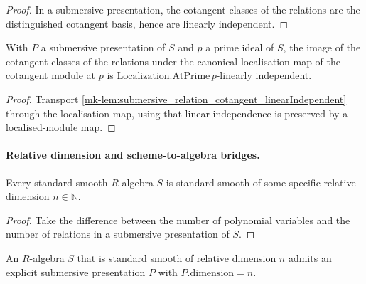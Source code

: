 \begin{proof}
  In a submersive presentation, the cotangent classes of the relations
  are the distinguished cotangent basis, hence are linearly independent.
\end{proof}

\begin{lemma}
  \label{mk-lem:submersive_relation_cotangent_linearIndependent_localized}
  With \(P\) a submersive presentation of \(S\) and \(p\) a prime ideal of \(S\), the
  image of the cotangent classes of the relations under the canonical localisation map
  of the cotangent module at \(p\) is \(\mathrm{Localization.AtPrime}\,p\)-linearly
  independent.
\end{lemma}

\begin{proof}
  Transport
  \ref{mk-lem:submersive_relation_cotangent_linearIndependent} through the localisation
  map, using that linear independence is preserved by a localised-module map.
\end{proof}

\paragraph{Relative dimension and scheme-to-algebra bridges.}

\begin{lemma}\label{mk-lem:exists_standardSmoothOfRelativeDimension_of_standardSmooth}
  \leanok

  Every standard-smooth \(R\)-algebra \(S\) is standard smooth of some specific
  relative dimension \(n \in \mathbb N\).
\end{lemma}

\begin{proof}
  Take the difference between the number of polynomial variables and
  the number of relations in a submersive presentation of \(S\).
\end{proof}

\begin{lemma}\label{mk-lem:exists_submersivePresentation_of_standardSmoothReldim}
  \leanok

  An \(R\)-algebra \(S\) that is standard smooth of relative dimension \(n\) admits an
  explicit submersive presentation \(P\) with \(P.\mathrm{dimension} = n\).
\end{lemma}

